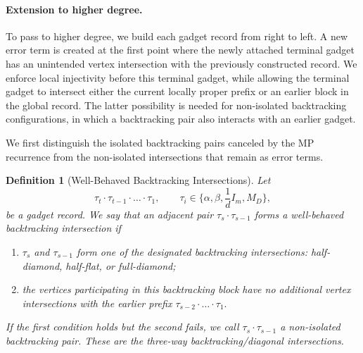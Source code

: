 \documentclass[12pt]{article}
\newtheorem{definition}[theorem]{Definition}
\begin{document}
\paragraph{Extension to higher degree.}
To pass to higher degree, we build each gadget record from right to left.
A new error term is created at the first point where the newly attached
terminal gadget has an unintended vertex intersection with the previously
constructed record. We enforce local injectivity before this terminal
gadget, while allowing the terminal gadget to intersect either the current
locally proper prefix or an earlier block in the global record. The latter
possibility is needed for non-isolated backtracking configurations, in
which a backtracking pair also interacts with an earlier gadget.

We first distinguish the isolated backtracking pairs canceled by the MP
recurrence from the non-isolated intersections that remain as error terms.

\begin{definition}[Well-Behaved Backtracking Intersections]
\label{def:well-behaved-backtracking}
Let
\[
    \tau_t\cdot\tau_{t-1}\cdot\dots\cdot\tau_1,
    \qquad
    \tau_i\in\{\alpha,\beta, \frac{1}{d} I_m, M_D\},
\]
be a gadget record. We say that an adjacent pair
\(
    \tau_s\cdot\tau_{s-1}
\)
forms a \emph{well-behaved backtracking intersection} if
\begin{enumerate}
    \item \(\tau_s\) and \(\tau_{s-1}\) form one of the designated
    backtracking intersections: half-diamond, half-flat, or full-diamond;
    \item the vertices participating in this backtracking block have no
    additional vertex intersections with the earlier prefix
    \(
        \tau_{s-2}\cdot\dots\cdot\tau_1.
    \)
\end{enumerate}
If the first condition holds but the second fails, we call
\(\tau_s\cdot\tau_{s-1}\) a \emph{non-isolated backtracking pair}.
These are the three-way backtracking/diagonal intersections.
\end{definition}
\end{document}
